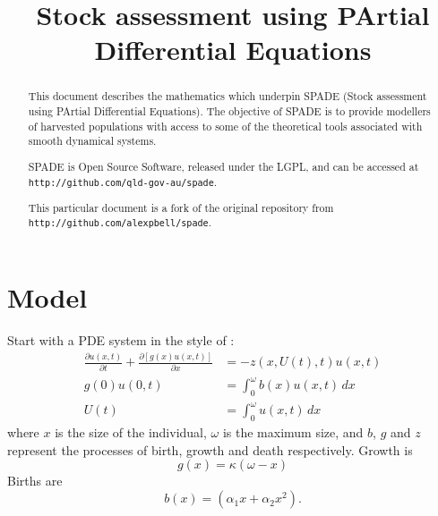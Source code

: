 \documentclass{article}
\title{Stock assessment using PArtial Differential Equations}
\author{}
\date{}
\begin{document}
\maketitle
\begin{abstract}
This document describes the mathematics which underpin SPADE (Stock assessment using PArtial Differential Equations).
The objective of SPADE is to provide modellers of
harvested populations with access to some of the theoretical
tools associated with smooth dynamical systems.

SPADE is Open Source Software, released under the LGPL, and can be accessed at\\
\verb"http://github.com/qld-gov-au/spade".

This particular document is a fork of the original repository from\\ \verb"http://github.com/alexpbell/spade".
\end{abstract}



\section{Model}
Start with a PDE system in the style of \cite{Murphy1983}:
\begin{subequations}
\label{eq:1}
\begin{align}
\frac{\partial u(x,t)}{\partial t} + \frac{\partial [g(x)u(x,t)]}{\partial x} &=
-z(x,U(t),t)u(x,t) \label{eq:1.1}\\
g(0)u(0,t) &=  \int_0^{\omega} b(x) u(x,t)\,dx\label{eq:1.2}\\ 
U(t) &= \int_0^{\omega} u(x,t)\, dx
\end{align}
\end{subequations}
where $x$ is the size of the individual, $\omega$ is the maximum size, and $b$, $g$ and $z$ represent the processes of birth, growth and death respectively.  Growth is 
\begin{equation}
  g(x) = \kappa (\omega - x)\label{eq:growth}
\end{equation}
Births are
\begin{equation}
  b(x) = \left(\alpha_1 x + \alpha_2 x^2\right)\label{eq:birth}.
\end{equation}
\end{document}

